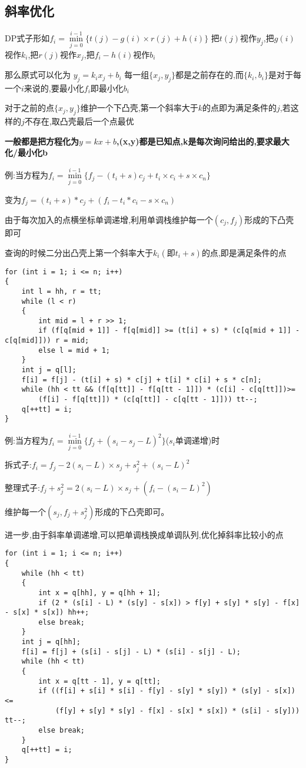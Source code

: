 \documentclass[a4paper,fontset=none]{ctexart}
\begin{document}
\subsection{斜率优化}

DP式子形如$f_i=\min\limits_{j=0}^{i-1} \{t(j)-g(i)\times r(j)+h(i)\}$ 把$t(j)$视作$y_j$,把$g(i)$视作$k_i$,把$r(j)$视作$x_j$,把$f_i-h(i)$视作$b_i$

那么原式可以化为  $y_j=k_ix_j+b_i$ 每一组$\{x_j,y_j\}$都是之前存在的,而$\{k_i,b_i\}$是对于每一个$i$来说的,要最小化$f_i$即最小化$b_i$

对于之前的点$\{x_j,y_j\}$维护一个下凸壳,第一个斜率大于$k$的点即为满足条件的$j$,若这样的$j$不存在,取凸壳最后一个点最优

\textbf{一般都是把方程化为}$y=kx+b$\textbf{,(x,y)都是已知点,k是每次询问给出的,要求最大化/最小化b}

例:当方程为$f_i=\min\limits_{j=0}^{i-1}\{f_j-(t_i+s)c_j+t_i\times c_i+s\times c_n\}$

变为$f_j=(t_i+s)*c_j+(f_i-t_i*c_i-s\times c_n)$

由于每次加入的点横坐标单调递增,利用单调栈维护每一个$(c_j,f_j)$形成的下凸壳即可

查询的时候二分出凸壳上第一个斜率大于$k_i(即t_i+s)$的点,即是满足条件的点

\begin{verbatim}
for (int i = 1; i <= n; i++)
{
    int l = hh, r = tt;
    while (l < r)
    {
        int mid = l + r >> 1;
        if (f[q[mid + 1]] - f[q[mid]] >= (t[i] + s) * (c[q[mid + 1]] - c[q[mid]])) r = mid;
        else l = mid + 1;
    }
    int j = q[l];
    f[i] = f[j] - (t[i] + s) * c[j] + t[i] * c[i] + s * c[n];
    while (hh < tt && (f[q[tt]] - f[q[tt - 1]]) * (c[i] - c[q[tt]])>=
        (f[i] - f[q[tt]]) * (c[q[tt]] - c[q[tt - 1]])) tt--;
    q[++tt] = i;
}
\end{verbatim}

例:当方程为$f_i=\min\limits_{j=0}^{i-1}\{f_j+(s_i-s_j-L)^2\}$($s_i$单调递增)时

拆式子:$f_i=f_j-2(s_i-L)\times s_j+s_j^2+(s_i-L)^2$

整理式子:$f_j+s_j^2=2(s_i-L)\times s_j+(f_i-(s_i-L)^2)$

维护每一个$(s_j,f_j+s_j^2)$形成的下凸壳即可。

进一步,由于斜率单调递增,可以把单调栈换成单调队列,优化掉斜率比较小的点


\begin{verbatim}
for (int i = 1; i <= n; i++)
{
    while (hh < tt)
    {
        int x = q[hh], y = q[hh + 1];
        if (2 * (s[i] - L) * (s[y] - s[x]) > f[y] + s[y] * s[y] - f[x] - s[x] * s[x]) hh++;
        else break;
    }
    int j = q[hh];
    f[i] = f[j] + (s[i] - s[j] - L) * (s[i] - s[j] - L);
    while (hh < tt)
    {
        int x = q[tt - 1], y = q[tt];
        if ((f[i] + s[i] * s[i] - f[y] - s[y] * s[y]) * (s[y] - s[x])<=
            (f[y] + s[y] * s[y] - f[x] - s[x] * s[x]) * (s[i] - s[y])) tt--;
        else break;
    }
    q[++tt] = i;
}
\end{verbatim}
\end{document}
